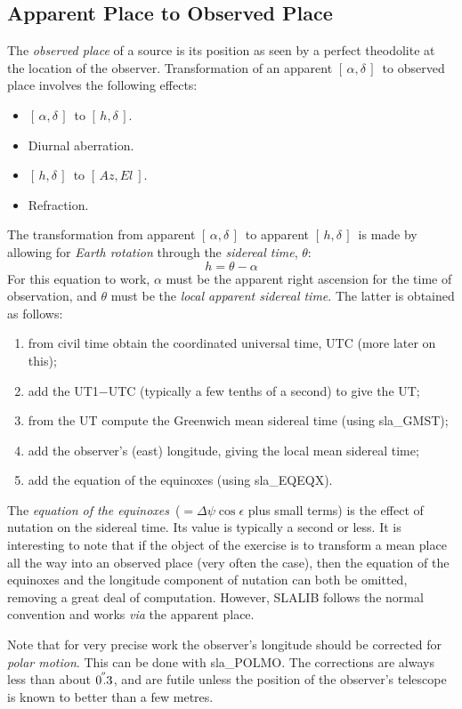 \documentclass[11pt,twoside]{article}
\newcommand{\radec}     {$[\,\alpha,\delta\,]$}
\newcommand{\hadec}     {$[\,h,\delta\,]$}
\newcommand{\azel}      {$[\,Az,El~]$}
\newcommand{\arcsec}[2] {\arcseci{#1}$\hspace{-0.4em}.#2$}
\newcommand{\arcsec}[2] {
      {$#1\hspace{-0.05em}^{'\hspace{-0.1em}'}\hspace{-0.4em}.#2$}
   }
\newcommand{\arcseci}[1] {$#1\hspace{-0.05em}$\raisebox{-0.5ex}
                         {$^{'\hspace{-0.1em}'}$}}
\renewcommand{\arcseci}[1] {$#1\hspace{-0.05em}^{'\hspace{-0.1em}'}$}
\begin{document}
\subsection{Apparent Place to Observed Place}
The {\it observed place}\/ of a source is its position as
seen by a perfect theodolite at the location of the
observer.  Transformation of an apparent \radec\ to observed
place involves the following effects:
\goodbreak
\begin{itemize}
   \item \radec\ to \hadec.
   \item Diurnal aberration.
   \item \hadec\ to \azel.
   \item Refraction.
\end{itemize}
The transformation from apparent \radec\ to
apparent \hadec\ is made by allowing for
{\it Earth rotation}\/ through the {\it sidereal time}, $\theta$:
\[ h = \theta - \alpha \]
For this equation to work, $\alpha$ must be the apparent right
ascension for the time of observation, and $\theta$ must be
the {\it local apparent sidereal time}.  The latter is obtained
as follows:
\begin{enumerate}
\item from civil time obtain the coordinated universal time, UTC
      (more later on this);
\item add the UT1$-$UTC (typically a few tenths of a second) to
      give the UT;
\item from the UT compute the Greenwich mean sidereal time (using
sla\_GMST);
\item add the observer's (east) longitude, giving the local mean
      sidereal time;
\item add the equation of the equinoxes (using
sla\_EQEQX).
\end{enumerate}
The {\it equation of the equinoxes}\/~($=\Delta\psi\cos\epsilon$ plus
small terms)
is the effect of nutation on the sidereal time.
Its value is typically a second or less.  It is
interesting to note that if the object of the exercise is to
transform a mean place all the way into an observed place (very
often the case),
then the equation of the
equinoxes and the longitude component of nutation can both be
omitted, removing a great deal of computation.  However, SLALIB
follows the normal convention and  works {\it via}\/ the apparent place.

Note that for very precise work the observer's longitude should
be corrected for {\it polar motion}.  This can be done with
sla\_POLMO.
The corrections are always less than about \arcsec{0}{3}, and
are futile unless the position of the observer's telescope is known
to better than a few metres.
\end{document}
